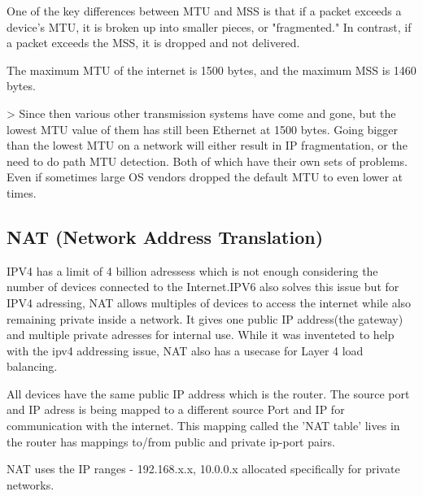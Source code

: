 \documentclass{article}
\begin{document}
One of the key differences between MTU and MSS is that if a packet exceeds a device's MTU, it is broken up into smaller pieces, or "fragmented." In contrast, if a packet exceeds the MSS, it is dropped and not delivered.

The maximum MTU of the internet is 1500 bytes, and the maximum MSS is 1460 bytes.

> Since then various other transmission systems have come and gone, but the lowest MTU value of them has still been Ethernet at 1500 bytes. Going bigger than the lowest MTU on a network will either result in IP fragmentation, or the need to do path MTU detection. Both of which have their own sets of problems. Even if sometimes large OS vendors dropped the default MTU to even lower at times.

\subsection*{NAT (Network Address Translation)}
IPV4 has a limit of 4 billion adressess which is not enough considering the number of devices connected to the Internet.IPV6 also solves this issue but for IPV4 adressing, NAT allows multiples of devices to  access the internet while also remaining private inside a network. It gives one public IP address(the gateway) and multiple private adresses for internal use. While it was inventeted to help with the ipv4 addressing issue, NAT also has a usecase for Layer 4 load balancing.

All devices have the same public IP address which is the router. The source port and IP adress is being mapped to a different source Port and IP for communication with the internet. This mapping called the 'NAT table' lives in the router has mappings to/from public and private ip-port pairs.

NAT uses the IP ranges - 192.168.x.x, 10.0.0.x allocated specifically for private networks.
\end{document}
